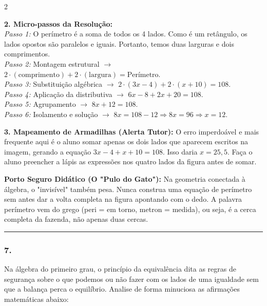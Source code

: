 \begin{multicols*}{2}
\begin{tcolorbox}[colback=CorTitUm!5, colframe=CorTitUm, boxrule=1pt, arc=4pt, left=6pt, right=6pt, top=6pt, bottom=6pt]
    \textbf{2. Micro-passos da Resolução:}\\
    \textit{Passo 1:} O perímetro é a soma de todos os 4 lados. Como é um retângulo, os lados opostos são paralelos e iguais. Portanto, temos duas larguras e dois comprimentos.\\
    \textit{Passo 2:} Montagem estrutural $\rightarrow$ $2 \cdot (\text{comprimento}) + 2 \cdot (\text{largura}) = \text{Perímetro}$.\\
    \textit{Passo 3:} Substituição algébrica $\rightarrow$ $2 \cdot (3x - 4) + 2 \cdot (x + 10) = 108$.\\
    \textit{Passo 4:} Aplicação da distributiva $\rightarrow$ $6x - 8 + 2x + 20 = 108$.\\
    \textit{Passo 5:} Agrupamento $\rightarrow$ $8x + 12 = 108$.\\
    \textit{Passo 6:} Isolamento e solução $\rightarrow$ $8x = 108 - 12 \Rightarrow 8x = 96 \Rightarrow x = 12$.\par\vspace{0.1cm}
    
    \textbf{3. Mapeamento de Armadilhas (Alerta Tutor):} O erro imperdoável e mais frequente aqui é o aluno somar apenas os dois lados que aparecem escritos na imagem, gerando a equação $3x - 4 + x + 10 = 108$. Isso daria $x = 25,5$. Faça o aluno preencher a lápis as expressões nos quatro lados da figura antes de somar.
    \end{tcolorbox}
    \vspace{0.15cm}
    
    \begin{boxexplicacao}
    \textbf{Porto Seguro Didático (O "Pulo do Gato"):} Na geometria conectada à álgebra, o "invisível" também pesa. Nunca construa uma equação de perímetro sem antes dar a volta completa na figura apontando com o dedo. A palavra perímetro vem do grego (peri = em torno, metron = medida), ou seja, é a cerca completa da fazenda, não apenas duas cercas.
    \end{boxexplicacao}
\fi

\par\vspace{\espacoQuestao}


\noindent\textcolor{CorLinha}{\rule{\linewidth}{0.5pt}} 
\par\vspace{\espacoPreQuestao}
\subsubsection*{7.} 
\begin{enunciadoLiteral}
Na álgebra do primeiro grau, o princípio da equivalência dita as regras de segurança sobre o que podemos ou não fazer com os lados de uma igualdade sem que a balança perca o equilíbrio. Analise de forma minuciosa as afirmações matemáticas abaixo:


\end{enunciadoLiteral}
\end{multicols*}
